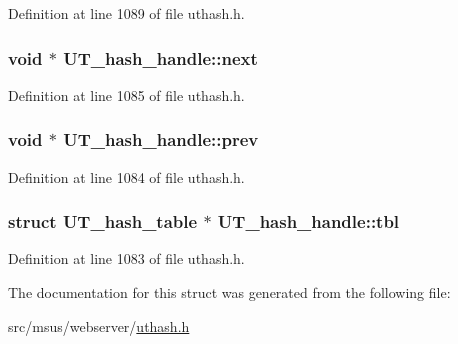 Definition at line 1089 of file uthash.\-h.

\hypertarget{struct_u_t__hash__handle_ac20c29619fd7716f7ba517a2cd651d27}{
\subsubsection[{next}]{\setlength{\rightskip}{0pt plus 5cm}void $\ast$ U\-T\-\_\-hash\-\_\-handle\-::next}}\label{struct_u_t__hash__handle_ac20c29619fd7716f7ba517a2cd651d27}


Definition at line 1085 of file uthash.\-h.

\hypertarget{struct_u_t__hash__handle_af266811bcd29460133f308987124034e}{
\subsubsection[{prev}]{\setlength{\rightskip}{0pt plus 5cm}void $\ast$ U\-T\-\_\-hash\-\_\-handle\-::prev}}\label{struct_u_t__hash__handle_af266811bcd29460133f308987124034e}


Definition at line 1084 of file uthash.\-h.

\hypertarget{struct_u_t__hash__handle_ad90bfc052210ed0dfe1afcf51f3a89b5}{
\subsubsection[{tbl}]{\setlength{\rightskip}{0pt plus 5cm}struct {\bf U\-T\-\_\-hash\-\_\-table} $\ast$ U\-T\-\_\-hash\-\_\-handle\-::tbl}}\label{struct_u_t__hash__handle_ad90bfc052210ed0dfe1afcf51f3a89b5}


Definition at line 1083 of file uthash.\-h.



The documentation for this struct was generated from the following file\-:\begin{DoxyCompactItemize}
\item 
src/msus/webserver/\hyperlink{msus_2webserver_2uthash_8h}{uthash.\-h}\end{DoxyCompactItemize}
